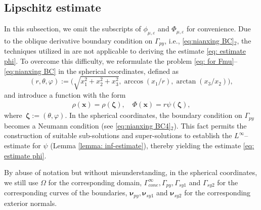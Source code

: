 \documentclass[reqno,12pt]{amsart}
\numberwithin{equation}{section}
\begin{document}
\subsection{Lipschitz estimate}\label{sec: prior estimate}
In this subsection, we omit the subscripts of $\phi_{\mu,\varepsilon}$ and $\Phi_{\mu,\varepsilon}$ for convenience. Due to the oblique derivative boundary condition on $\Gamma_{py}$, i.e., \eqref{eq:nianxing BC}$_2$, the techniques utilized in \cite{LY22} are not applicable to deriving the estimate \eqref{eq: estimate phi}. To overcome this difficulty, we reformulate the problem \eqref{eq: for Fmu}--\eqref{eq:nianxing BC} in the spherical coordinates, defined as
\begin{equation*}
    (r,\theta,\varphi):= \big(\sqrt{x^2_1+x^2_2+x^2_3}, \arccos{(x_1/r)}, \arctan{({x_3}/{x_2})}\big),
\end{equation*}
and introduce a function with the form
\begin{align}\label{eq: spherical tran.}
    \rho(\bm{x})=\rho(\bm{\zeta}), \quad \Phi(\bm{x})=r\psi(\bm{\zeta}),
\end{align}
where~$\bm{\zeta}:=(\theta, \varphi)$. In the spherical coordinates, the boundary condition on $\Gamma_{py}$ becomes a Neumann condition (see \eqref{eq:nianxing BC4}$_2$). This fact permits the construction of suitable sub-solutions and super-solutions to establish the $L^\infty$--estimate for $\psi$ (Lemma \ref{lemma: inf-estimate}), thereby yielding the estimate \eqref{eq: estimate phi}.

By abuse of notation but without misunderstanding, in the spherical coordinates, we still use $\Omega$ for the corresponding domain, $\Gamma_{cone}^{\infty},\Gamma_{py},\Gamma_{sy1}$ and $\Gamma_{sy2}$ for the corresponding curves of the boundaries, $\bm{\nu}_{py},\bm{\nu}_{sy1}$ and $\bm{\nu}_{sy2}$ for the corresponding exterior normals.
\end{document}
